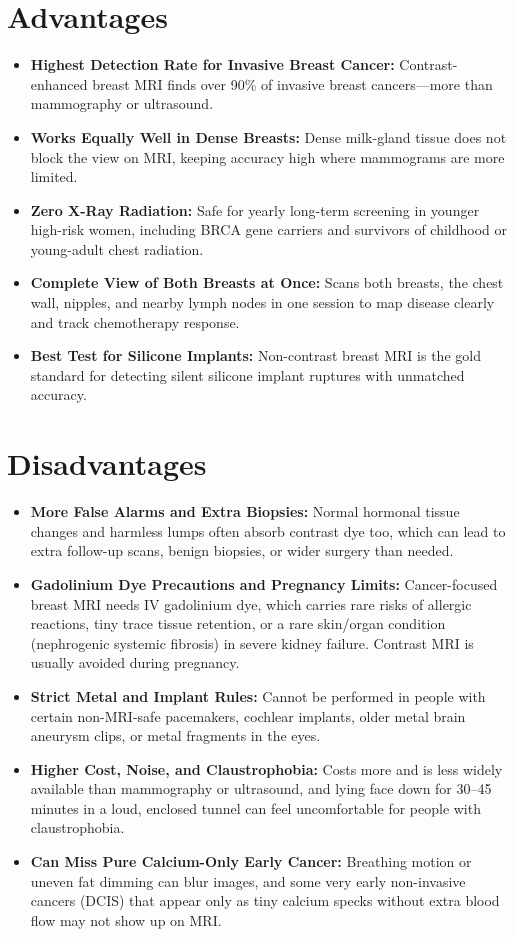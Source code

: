 \section{Advantages}
\begin{itemize}
\item \textbf{Highest Detection Rate for Invasive Breast Cancer:} Contrast-enhanced breast MRI finds over 90\% of invasive breast cancers---more than mammography or ultrasound.
\item \textbf{Works Equally Well in Dense Breasts:} Dense milk-gland tissue does not block the view on MRI, keeping accuracy high where mammograms are more limited.
\item \textbf{Zero X-Ray Radiation:} Safe for yearly long-term screening in younger high-risk women, including BRCA gene carriers and survivors of childhood or young-adult chest radiation.
\item \textbf{Complete View of Both Breasts at Once:} Scans both breasts, the chest wall, nipples, and nearby lymph nodes in one session to map disease clearly and track chemotherapy response.
\item \textbf{Best Test for Silicone Implants:} Non-contrast breast MRI is the gold standard for detecting silent silicone implant ruptures with unmatched accuracy.
\end{itemize}

\section{Disadvantages}
\begin{itemize}
\item \textbf{More False Alarms and Extra Biopsies:} Normal hormonal tissue changes and harmless lumps often absorb contrast dye too, which can lead to extra follow-up scans, benign biopsies, or wider surgery than needed.
\item \textbf{Gadolinium Dye Precautions and Pregnancy Limits:} Cancer-focused breast MRI needs IV gadolinium dye, which carries rare risks of allergic reactions, tiny trace tissue retention, or a rare skin/organ condition (nephrogenic systemic fibrosis) in severe kidney failure. Contrast MRI is usually avoided during pregnancy.
\item \textbf{Strict Metal and Implant Rules:} Cannot be performed in people with certain non-MRI-safe pacemakers, cochlear implants, older metal brain aneurysm clips, or metal fragments in the eyes.
\item \textbf{Higher Cost, Noise, and Claustrophobia:} Costs more and is less widely available than mammography or ultrasound, and lying face down for 30--45 minutes in a loud, enclosed tunnel can feel uncomfortable for people with claustrophobia.
\item \textbf{Can Miss Pure Calcium-Only Early Cancer:} Breathing motion or uneven fat dimming can blur images, and some very early non-invasive cancers (DCIS) that appear only as tiny calcium specks without extra blood flow may not show up on MRI.
\end{itemize}

